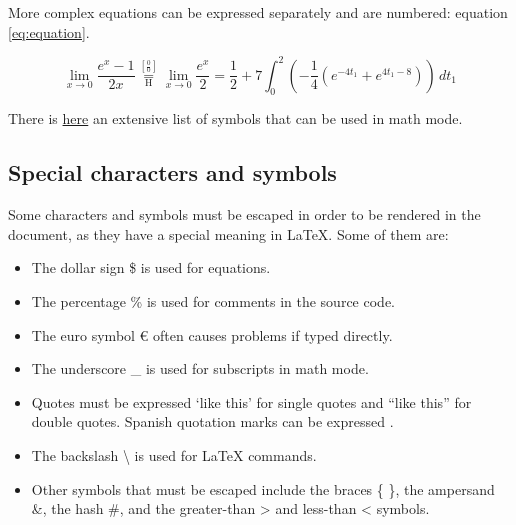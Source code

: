 More complex equations can be expressed separately and are numbered: equation \ref{eq:equation}.

\begin{equation}\label{eq:equation}
\lim_{x\to 0}{\frac{e^x-1}{2x}}
 \overset{\left[\frac{0}{0}\right]}{\underset{\mathrm{H}}{=}}
 \lim_{x\to 0}{\frac{e^x}{2}}={\frac{1}{2}}
 +7 \int_0^2
  \left(
    -\frac{1}{4}\left(e^{-4t_1}+e^{4t_1-8}\right)
  \right)\,dt_1
\end{equation}

There is \href{http://www.yann-ollivier.org/latex/texsymbols.pdf}{here} an extensive list of symbols that can be used in math mode.

\subsection{Special characters and symbols}
Some characters and symbols must be escaped in order to be rendered in the document, as they have a special meaning in LaTeX. Some of them are:

\begin{itemize}
     \item The dollar sign \$ is used for equations.
     \item The percentage \% is used for comments in the source code.
     \item The euro symbol \euro{} often causes problems if typed directly.
     \item The underscore \_ is used for subscripts in math mode.
     \item Quotes must be expressed `like this' for single quotes and ``like this'' for double quotes. Spanish quotation marks can be expressed .
     \item The backslash \textbackslash{} is used for LaTeX commands.
     \item Other symbols that must be escaped include the braces \{ \}, the ampersand \&, the hash \#, and the greater-than \textgreater{} and less-than \textless{} symbols.
\end{itemize}